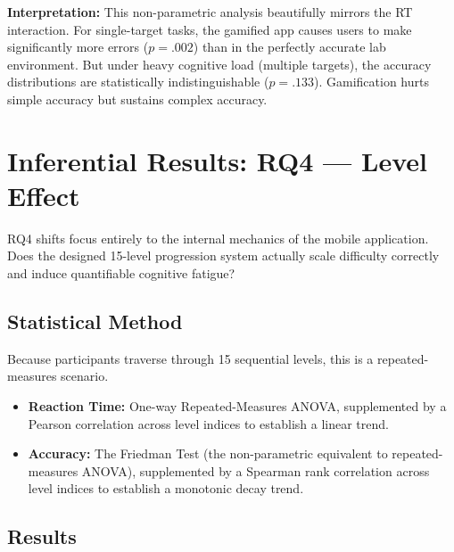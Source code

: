 \documentclass[11pt,a4paper]{article}
\begin{document}
\textbf{Interpretation:} This non-parametric analysis beautifully mirrors the RT interaction. For single-target tasks, the gamified app causes users to make significantly more errors ($p = .002$) than in the perfectly accurate lab environment. But under heavy cognitive load (multiple targets), the accuracy distributions are statistically indistinguishable ($p = .133$). Gamification hurts simple accuracy but sustains complex accuracy.

\section{Inferential Results: RQ4 --- Level Effect}
\label{sec:rq4}

RQ4 shifts focus entirely to the internal mechanics of the mobile application. Does the designed 15-level progression system actually scale difficulty correctly and induce quantifiable cognitive fatigue?

\subsection{Statistical Method}
Because participants traverse through 15 sequential levels, this is a repeated-measures scenario.
\begin{itemize}
    \item \textbf{Reaction Time:} One-way Repeated-Measures ANOVA, supplemented by a Pearson correlation across level indices to establish a linear trend.
    \item \textbf{Accuracy:} The Friedman Test (the non-parametric equivalent to repeated-measures ANOVA), supplemented by a Spearman rank correlation across level indices to establish a monotonic decay trend.
\end{itemize}

\subsection{Results}
\end{document}
